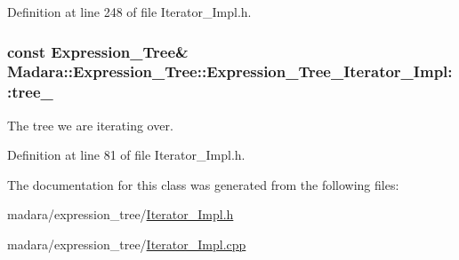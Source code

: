 Definition at line 248 of file Iterator\_\-Impl.h.

\hypertarget{classMadara_1_1Expression__Tree_1_1Expression__Tree__Iterator__Impl_a4b369e3fcfc62405321ece1d46719f93}{
\subsubsection[{tree\_\-}]{\setlength{\rightskip}{0pt plus 5cm}const {\bf Expression\_\-Tree}\& {\bf Madara::Expression\_\-Tree::Expression\_\-Tree\_\-Iterator\_\-Impl::tree\_\-}}}
\label{d0/dd7/classMadara_1_1Expression__Tree_1_1Expression__Tree__Iterator__Impl_a4b369e3fcfc62405321ece1d46719f93}


The tree we are iterating over. 



Definition at line 81 of file Iterator\_\-Impl.h.



The documentation for this class was generated from the following files:\begin{DoxyCompactItemize}
\item 
madara/expression\_\-tree/\hyperlink{Iterator__Impl_8h}{Iterator\_\-Impl.h}\item 
madara/expression\_\-tree/\hyperlink{Iterator__Impl_8cpp}{Iterator\_\-Impl.cpp}\end{DoxyCompactItemize}
